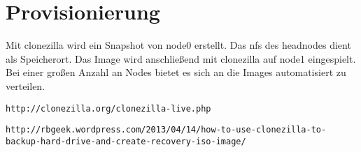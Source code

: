 \chapter{Provisionierung}
Mit clonezilla wird ein Snapshot von node0 erstellt. Das nfs des headnodes dient als Speicherort.
Das Image wird anschließend mit clonezilla auf node1 eingespielt.
Bei einer großen Anzahl an Nodes bietet es sich an die Images automatisiert zu verteilen.
\begin{lstlisting}[style=bash]
http://clonezilla.org/clonezilla-live.php
\end{lstlisting}
\begin{lstlisting}[style=bash]
http://rbgeek.wordpress.com/2013/04/14/how-to-use-clonezilla-to-backup-hard-drive-and-create-recovery-iso-image/
\end{lstlisting}

